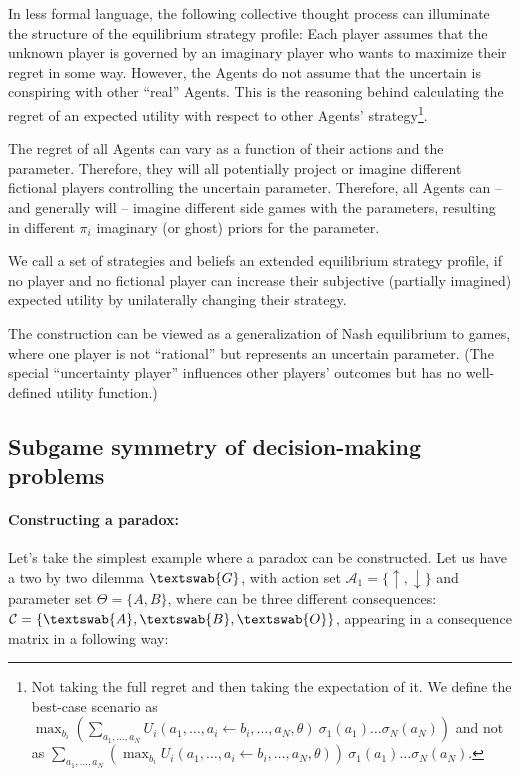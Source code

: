 \documentclass{article}
\begin{document}
In less formal language, the following collective thought process can illuminate the structure of the equilibrium strategy profile:
Each player assumes that the unknown player is governed by an imaginary player who wants to maximize their regret in some way. However, the Agents do not assume that the uncertain is conspiring with other ``real'' Agents. This is the reasoning behind calculating the regret of an expected utility with respect to other Agents' strategy\footnote{Not taking the full regret and then taking the expectation of it. We define the best-case scenario as $\max_{b_i} 
\left (
\sum_{a_1,\dots,a_N} U_i(a_1,\dots,a_i \leftarrow b_i,\dots,a_N,\theta) \ 
\sigma_1(a_1) \dots \sigma_N(a_N)
\right )$
and not as
$ \sum_{a_1,\dots,a_N} \left ( \max_{b_i} U_i(a_1,\dots,a_i \leftarrow b_i,\dots,a_N,\theta) \right ) \ 
\sigma_1(a_1) \dots \sigma_N(a_N)
$.
}.

The regret of all Agents can vary as a function of their actions and the parameter. Therefore, they will all potentially project or imagine different fictional players controlling the uncertain parameter.
Therefore, all Agents can -- and generally will -- imagine different side games with the parameters, resulting in different $\pi_i$ imaginary (or ghost) priors for the parameter.

We call a set of strategies and beliefs an extended equilibrium strategy profile, if no player and no fictional player can increase their subjective (partially imagined) expected utility by unilaterally changing their strategy.

The construction can be viewed as a generalization of Nash equilibrium to games, where one player is not ``rational'' but represents an uncertain parameter. (The special ``uncertainty player'' influences other players' outcomes but has no well-defined utility function.)

\subsection*{Subgame symmetry of decision-making problems}

\paragraph{Constructing a paradox:}

Let's take the simplest example where a paradox can be constructed.
Let us have a two by two dilemma $\textswab{G}$, with action set $\mathcal{A}_1 = \{\uparrow,\downarrow\}$ and parameter set $\Theta=\{A,B\}$, where can be three different consequences: $\mathcal{C}=\{\textswab{A},\textswab{B},\textswab{O}\}$, appearing in a consequence matrix in a following way:
\end{document}
